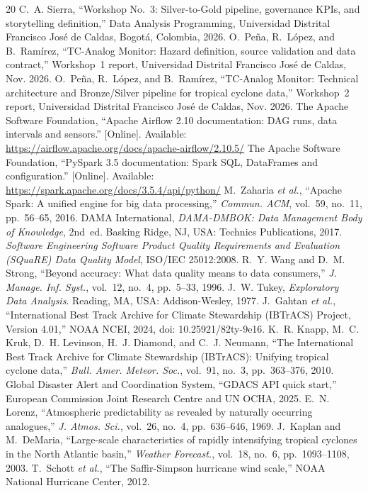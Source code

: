 \documentclass[10pt,twocolumn,letterpaper]{article}
\begin{document}
\balance
\begin{thebibliography}{20}
\footnotesize
\setlength{\itemsep}{1pt}
 C.~A. Sierra, ``Workshop No.~3: Silver-to-Gold pipeline, governance KPIs, and storytelling definition,'' Data Analysis Programming, Universidad Distrital Francisco José de Caldas, Bogotá, Colombia, 2026.
 O.~Peña, R.~López, and B.~Ramírez, ``TC-Analog Monitor: Hazard definition, source validation and data contract,'' Workshop~1 report, Universidad Distrital Francisco José de Caldas, Nov. 2026.
 O.~Peña, R.~López, and B.~Ramírez, ``TC-Analog Monitor: Technical architecture and Bronze/Silver pipeline for tropical cyclone data,'' Workshop~2 report, Universidad Distrital Francisco José de Caldas, Nov. 2026.
 The Apache Software Foundation, ``Apache Airflow 2.10 documentation: DAG runs, data intervals and sensors.'' [Online]. Available: \url{https://airflow.apache.org/docs/apache-airflow/2.10.5/}
 The Apache Software Foundation, ``PySpark 3.5 documentation: Spark SQL, DataFrames and configuration.'' [Online]. Available: \url{https://spark.apache.org/docs/3.5.4/api/python/}
 M.~Zaharia \emph{et al.}, ``Apache Spark: A unified engine for big data processing,'' \emph{Commun. ACM}, vol.~59, no.~11, pp.~56--65, 2016.
 DAMA International, \emph{DAMA-DMBOK: Data Management Body of Knowledge}, 2nd~ed. Basking Ridge, NJ, USA: Technics Publications, 2017.
 \emph{Software Engineering \textemdash{} Software Product Quality Requirements and Evaluation (SQuaRE) \textemdash{} Data Quality Model}, ISO/IEC 25012:2008.
 R.~Y. Wang and D.~M. Strong, ``Beyond accuracy: What data quality means to data consumers,'' \emph{J. Manage. Inf. Syst.}, vol.~12, no.~4, pp.~5--33, 1996.
 J.~W. Tukey, \emph{Exploratory Data Analysis}. Reading, MA, USA: Addison-Wesley, 1977.
 J.~Gahtan \emph{et al.}, ``International Best Track Archive for Climate Stewardship (IBTrACS) Project, Version 4.01,'' NOAA NCEI, 2024, doi: 10.25921/82ty-9e16.
 K.~R. Knapp, M.~C. Kruk, D.~H. Levinson, H.~J. Diamond, and C.~J. Neumann, ``The International Best Track Archive for Climate Stewardship (IBTrACS): Unifying tropical cyclone data,'' \emph{Bull. Amer. Meteor. Soc.}, vol.~91, no.~3, pp.~363--376, 2010.
 Global Disaster Alert and Coordination System, ``GDACS API quick start,'' European Commission Joint Research Centre and UN OCHA, 2025.
 E.~N. Lorenz, ``Atmospheric predictability as revealed by naturally occurring analogues,'' \emph{J. Atmos. Sci.}, vol.~26, no.~4, pp.~636--646, 1969.
 J.~Kaplan and M.~DeMaria, ``Large-scale characteristics of rapidly intensifying tropical cyclones in the North Atlantic basin,'' \emph{Weather Forecast.}, vol.~18, no.~6, pp.~1093--1108, 2003.
 T.~Schott \emph{et al.}, ``The Saffir-Simpson hurricane wind scale,'' NOAA National Hurricane Center, 2012.
\end{thebibliography}
\end{document}
